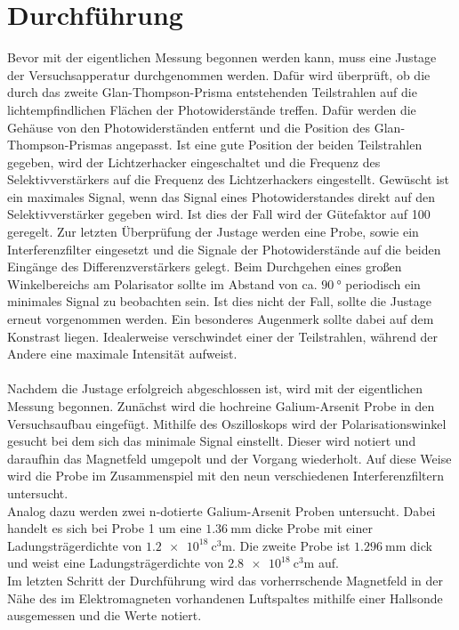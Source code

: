 \section{Durchführung}
Bevor mit der eigentlichen Messung begonnen werden kann, muss eine Justage der Versuchsapperatur durchgenommen 
werden. Dafür wird überprüft, ob die durch das zweite Glan-Thompson-Prisma entstehenden Teilstrahlen auf
die lichtempfindlichen Flächen der Photowiderstände treffen. Dafür werden die Gehäuse von den Photowiderständen
entfernt und die Position des Glan-Thompson-Prismas angepasst. Ist eine gute Position der beiden 
Teilstrahlen gegeben, wird der Lichtzerhacker eingeschaltet und die Frequenz des Selektivverstärkers auf
die Frequenz des Lichtzerhackers eingestellt. Gewüscht ist ein maximales Signal, wenn das Signal eines 
Photowiderstandes direkt auf den Selektivverstärker gegeben wird. Ist dies der Fall wird der 
Gütefaktor auf 100 geregelt. Zur letzten Überprüfung der Justage werden eine Probe, sowie ein
Interferenzfilter eingesetzt und die Signale der Photowiderstände auf die beiden Eingänge des 
Differenzverstärkers gelegt. Beim Durchgehen eines großen Winkelbereichs am Polarisator sollte im Abstand von ca. 
$\SI{90}{\degree}$ periodisch ein minimales Signal zu beobachten sein. Ist dies nicht der Fall, sollte 
die Justage erneut vorgenommen werden. Ein besonderes Augenmerk sollte dabei auf dem Konstrast liegen. 
Idealerweise verschwindet einer der Teilstrahlen, während der Andere eine maximale Intensität aufweist. \\
\\
Nachdem die Justage erfolgreich abgeschlossen ist, wird mit der eigentlichen Messung begonnen. Zunächst 
wird die hochreine Galium-Arsenit Probe in den Versuchsaufbau eingefügt. Mithilfe des Oszilloskops 
wird der Polarisationswinkel gesucht bei dem sich das minimale Signal einstellt. Dieser wird notiert und
daraufhin das Magnetfeld umgepolt und der Vorgang wiederholt. Auf diese Weise wird die Probe im Zusammenspiel
mit den neun verschiedenen Interferenzfiltern untersucht. \\
Analog dazu werden zwei n-dotierte Galium-Arsenit Proben untersucht. Dabei handelt es sich bei Probe 1 
um eine $\SI{1.36}{\milli\meter}$ dicke Probe mit einer Ladungsträgerdichte von
$\SI{1.2e18}{\cubic\centi\meter}$. Die zweite Probe ist $\SI{1.296}{\milli\meter}$ dick und weist eine 
Ladungsträgerdichte von $\SI{2,8e18}{\cubic\centi\meter}$ auf. \\
Im letzten Schritt der Durchführung wird das vorherrschende Magnetfeld in der Nähe des im Elektromagneten 
vorhandenen Luftspaltes mithilfe einer Hallsonde ausgemessen und die Werte notiert.